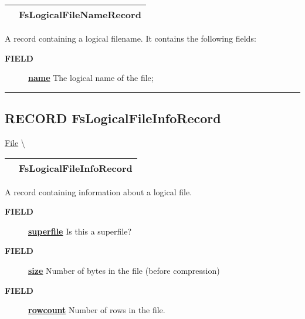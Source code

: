 {\renewcommand{\arraystretch}{1.5}
\begin{tabularx}{\textwidth}{|>{\raggedright\arraybackslash}l|X|}
\hline
\hspace{0pt}\mytexttt{\color{red} } & \textbf{FsLogicalFileNameRecord} \\
\hline
\end{tabularx}
}

\par
A record containing a logical filename. It contains the following fields:

\par
\begin{description}
\item [\colorbox{tagtype}{\color{white} \textbf{\textsf{FIELD}}}] \textbf{\underline{name}} The logical name of the file;
\end{description}

\rule{\linewidth}{0.5pt}
\subsection*{\textsf{\colorbox{headtoc}{\color{white} RECORD}
FsLogicalFileInfoRecord}}

\hypertarget{ecldoc:file.fslogicalfileinforecord}{}
\hspace{0pt} \hyperlink{ecldoc:File}{File} \textbackslash 

{\renewcommand{\arraystretch}{1.5}
\begin{tabularx}{\textwidth}{|>{\raggedright\arraybackslash}l|X|}
\hline
\hspace{0pt}\mytexttt{\color{red} } & \textbf{FsLogicalFileInfoRecord} \\
\hline
\end{tabularx}
}

\par
A record containing information about a logical file.

\par
\begin{description}
\item [\colorbox{tagtype}{\color{white} \textbf{\textsf{FIELD}}}] \textbf{\underline{superfile}} Is this a superfile?
\item [\colorbox{tagtype}{\color{white} \textbf{\textsf{FIELD}}}] \textbf{\underline{size}} Number of bytes in the file (before compression)
\item [\colorbox{tagtype}{\color{white} \textbf{\textsf{FIELD}}}] \textbf{\underline{rowcount}} Number of rows in the file.
\end{description}

